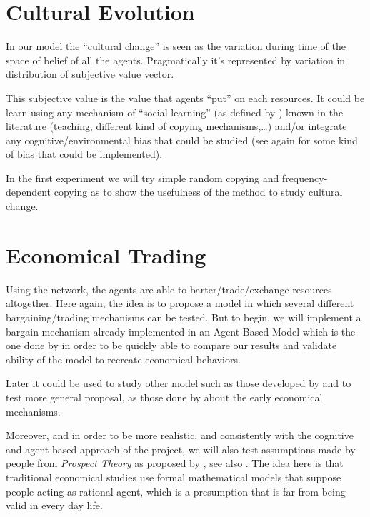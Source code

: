 \documentclass[a4paper]{article}
\begin{document}
\section{Cultural Evolution}
In our model the ``cultural change'' is seen as the variation during time of the space of belief of all the agents. Pragmatically it's represented by variation in distribution of subjective value vector.

This subjective value is the value that agents ``put'' on each resources. It could be learn using any mechanism of ``social learning'' (as defined by \cite{lycett_cultural_2015}) known in the literature (teaching, different kind of copying mechanisms,\ldots) and/or integrate any cognitive/environmental bias that could be studied (see again \cite{lycett_cultural_2015} for some kind of bias that could be implemented).

In the first experiment we will try simple random copying and frequency-dependent copying as \cite{mesoudi_random_2009} to show the usefulness of the method to study cultural change. 


\section{Economical Trading}
\label{trade}

Using the network, the agents are able to barter/trade/exchange resources altogether. Here again, the idea is to propose a model in which several different bargaining/trading mechanisms can be tested. But to begin, we will implement a bargain mechanism already implemented in an Agent Based Model which is the one done by
\cite{gintis_emergence_2006} in order to be quickly able to compare our results and validate ability of the model to recreate economical behaviors. 

Later it could be used to study other model such as those developed by 
\cite{rubinstein1985equilibriuminamarketwithsequentialbargaining} and to test more general proposal, as those done by \cite{polanyi1957tradeandmarketintheearlyempireseconomiesinhistoryandtheory,
polanyi1977thelivelihoodofman} about the early economical mechanisms.

Moreover, and in order to be more realistic, and consistently with the cognitive and agent based approach of the project, we will also test assumptions made by people from \emph{Prospect Theory} as proposed by 
\cite{kahneman_prospect_1979}, see also
\cite{camerer_prospect_2004}. The idea here is that traditional economical studies use formal mathematical models that suppose people acting as rational agent, which is a presumption that is far from being valid  in every day life. 
\end{document}
